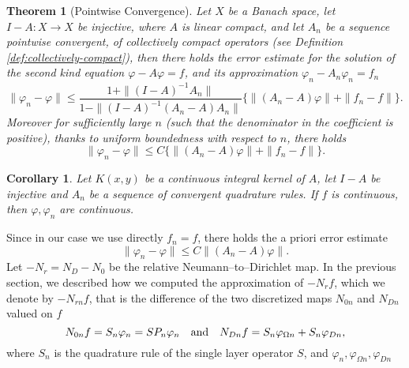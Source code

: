 \documentclass[10pt, a4paper, twoside, openright]{book}
\theoremstyle{definition}
\theoremstyle{plain}
\newtheorem{theorem}[subsection]{Theorem}
\theoremstyle{plain}
\newtheorem{corollary}[subsection]{Corollary}
\theoremstyle{plain}
\theoremstyle{plain}
\theoremstyle{plain}
\theoremstyle{plain}
\theoremstyle{plain}
\theoremstyle{plain}
\let\phi\varphi
\begin{document}
\begin{theorem}[Pointwise Convergence]
 Let $X$ be a Banach space, let $I-A:X\to X$ be injective, 
 where $A$ is linear compact, 
 and let $A_n$ be a sequence \emph{pointwise convergent}, of \emph{collectively compact} operators 
 (see Definition \ref{def:collectively-compact}), 
 then there holds the error estimate for the solution of the second kind equation $\phi-A\phi=f$, and its approximation $\phi_n - A_n\phi_n=f_n$
 \begin{equation}
  \|\phi_n - \phi \| \leq \frac{1 + \|(I-A)^{-1}A_n\|}{1-\|(I-A)^{-1}(A_n-A)A_n\|}\{\|(A_n - A)\phi\| + \| f_n - f\|\}.
 \end{equation}
 Moreover for sufficiently large $n$ (such that the denominator in the coefficient is positive), thanks to uniform boundedness with respect to $n$, there holds      
 \begin{equation}
  \|\phi_n - \phi \| \leq C\{\|(A_n - A)\phi\| + \| f_n - f\|\}.
 \end{equation}
\end{theorem}
\begin{corollary}
 Let $K(x,y)$ be a continuous integral kernel of $A$, let $I-A$ be injective and $A_n$ be a sequence of convergent quadrature rules. 
 If $f$ is continuous, then $\phi,\phi_n$ are continuous. 
\end{corollary}
Since in our case we use directly $f_n=f$, there holds the a priori error estimate
 \begin{equation}
  \|\phi_n - \phi \| \leq C\|(A_n - A)\phi\|.
 \end{equation}
Let $-N_r=N_D - N_0$ be the relative Neumann--to--Dirichlet map. In the previous section, we described
how we computed the approximation of $-{N_r}f$, which we denote by $-{N_{rn}}f$, that is the difference 
of the two discretized maps $N_{0n}$ and $N_{Dn}$ valued on $f$
\begin{equation}
\label{eq:N0n-Ndn}
 {N_{0n}}f = S_n\phi_n = SP_n\phi_n\quad \textup{and} \quad{N_{Dn}}f = S_n\phi_{\Omega n} + S_n\phi_{D n},
\end{equation}
where $S_n$ is the quadrature rule of the single layer operator $S$, and 
$\phi_n, \phi_{\Omega n}, \phi_{Dn}$ 
\end{document}
